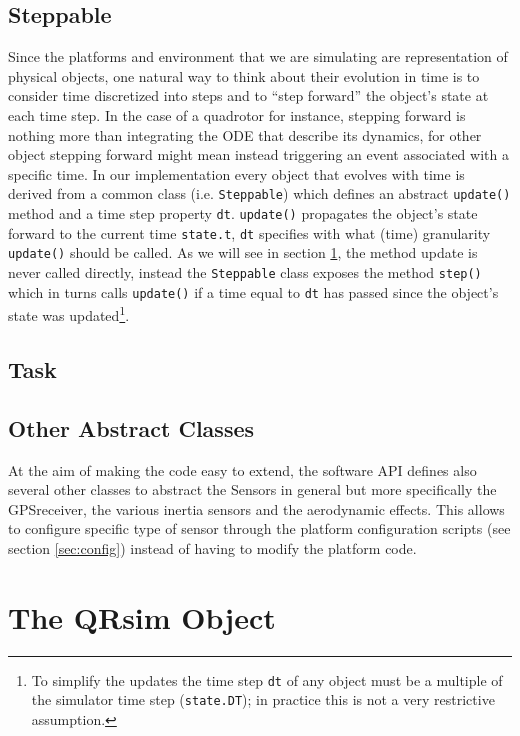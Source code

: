 \documentclass[a4paper,11pt]{report}
\newcommand{\sname}{QRsim\xspace}
\begin{document}
\subsection{Steppable}

Since the platforms and environment that we are simulating are representation of physical objects, one natural way to think about their evolution in time is to consider time discretized into steps and to ``step forward'' the object's state at each time step. In the case of a quadrotor for instance, stepping forward is nothing more than integrating the ODE that describe its dynamics, for other object stepping forward might mean instead triggering an event associated with a specific time.
In our implementation every object that evolves with time is derived from a common class (i.e. \texttt{Steppable}) which defines an abstract \texttt{update()} method and a time step property \texttt{dt}. \texttt{update()} propagates the object's state forward to the current time \texttt{state.t}, \texttt{dt} specifies with what (time) granularity \texttt{update()} should be called. As we will see in section \ref{sec:qrobj}, the method update is never called directly, instead the  \texttt{Steppable} class exposes the method \texttt{step()} which in turns calls \texttt{update()} if a time equal to \texttt{dt} has passed since the object's state was updated\footnote{To simplify the updates the time step \texttt{dt} of any object must be a multiple of the simulator time step (\texttt{state.DT}); in practice this is not a very restrictive assumption.}.

\subsection{Task}



\subsection{Other Abstract Classes}

At the aim of making the code easy to extend, the software API defines also several other classes to abstract the Sensors in general but more specifically the GPSreceiver, the various inertia sensors and the aerodynamic effects. This allows to configure specific type of sensor through the platform configuration scripts (see section \ref{sec:config}) instead of having to modify the platform code.

\section{The \sname Object}\label{sec:qrobj}
\end{document}
